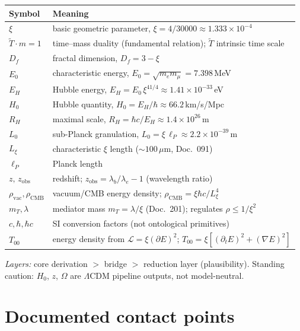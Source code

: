 \noindent
\begin{tabular}{@{}ll@{}}
\toprule
Symbol & Meaning \\
\midrule
$\xi$ & basic geometric parameter, $\xi = 4/30000 \approx 1.333\times10^{-4}$ \\
$\tilde T\cdot m=1$ & time--mass duality (fundamental relation); $\tilde T$ intrinsic time scale \\
$D_f$ & fractal dimension, $D_f = 3-\xi$ \\
$E_0$ & characteristic energy, $E_0=\sqrt{m_e m_\mu}=7.398$\,MeV \\
$E_H$ & Hubble energy, $E_H = E_0\,\xi^{41/4} \approx 1.41\times10^{-33}$\,eV \\
$H_0$ & Hubble quantity, $H_0 = E_H/\hbar \approx 66.2$\,km/s/Mpc \\
$R_H$ & maximal scale, $R_H = \hbar c/E_H \approx 1.4\times10^{26}$\,m \\
$L_0$ & sub-Planck granulation, $L_0 = \xi\,\ell_P \approx 2.2\times10^{-39}$\,m \\
$L_\xi$ & characteristic $\xi$ length ($\sim 100\,\mu$m, Doc.~091) \\
$\ell_P$ & Planck length \\
$z,\,z_{\text{obs}}$ & redshift; $z_{\text{obs}}=\lambda_b/\lambda_e-1$ (wavelength ratio) \\
$\rho_{\text{vac}},\rho_{\text{CMB}}$ & vacuum/CMB energy density; $\rho_{\text{CMB}}=\xi\hbar c/L_\xi^4$ \\
$m_T,\lambda$ & mediator mass $m_T=\lambda/\xi$ (Doc.~201); regulates $\rho\le 1/\xi^2$ \\
$c,\hbar,\hbar c$ & SI conversion factors (not ontological primitives) \\
$T_{00}$ & energy density from $\mathcal{L}=\xi(\partial E)^2$; $T_{00}=\xi[(\partial_t E)^2+(\nabla E)^2]$ \\
\bottomrule
\end{tabular}

\medskip
\noindent\emph{Layers:} core derivation $>$ bridge $>$ reduction layer
(plausibility). Standing caution: $H_0$, $z$, $\Omega$ are $\Lambda$CDM
pipeline outputs, not model-neutral.

\section{Documented contact points}
\label{sec:263-doc}

